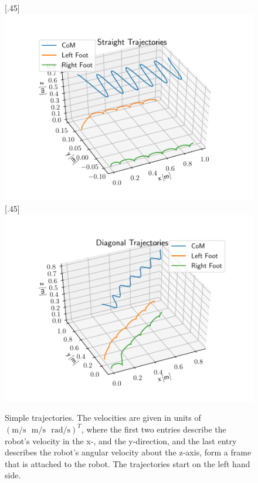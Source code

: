 \begin{figure}[h!]
	\centering
	[.45\linewidth]{\includegraphics[scale=.45]{chapters/05_experiments/01_user_controlled_walking/01_benchmarking/nmpc_straight.pdf}}
	[.45\linewidth]{\includegraphics[scale=.45]{chapters/05_experiments/01_user_controlled_walking/01_benchmarking/nmpc_diagonal.pdf}}
	\caption{Simple trajectories. The velocities are given in units of\\$(\text{m}/\text{s}\,\,\,\,\text{m}/\text{s}\,\,\,\,\text{rad}/\text{s})^T$, where the first two entries describe the robot's velocity in the x-, and the y-direction, and the last entry describes the robot's angular velocity about the z-axis, form a frame that is attached to the robot. The trajectories start on the left hand side.}
	\label{fig::511_benchmarking_basic}
\end{figure} 
